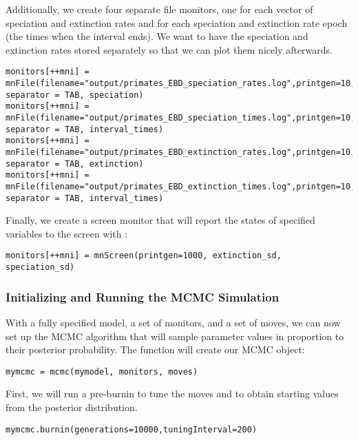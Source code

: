 Additionally, we create four separate file monitors, one for each vector of speciation and extinction rates and for each speciation and extinction rate epoch (\IE the times when the interval ends).
We want to have the speciation and extinction rates stored separately so that we can plot them nicely afterwards.
{\tt \begin{snugshade*}
\begin{lstlisting}
monitors[++mni] = mnFile(filename="output/primates_EBD_speciation_rates.log",printgen=10, separator = TAB, speciation)
monitors[++mni] = mnFile(filename="output/primates_EBD_speciation_times.log",printgen=10, separator = TAB, interval_times)
monitors[++mni] = mnFile(filename="output/primates_EBD_extinction_rates.log",printgen=10, separator = TAB, extinction)
monitors[++mni] = mnFile(filename="output/primates_EBD_extinction_times.log",printgen=10, separator = TAB, interval_times)
\end{lstlisting}
\end{snugshade*}}

Finally, we create a screen monitor that will report the states of specified variables to the screen with :
{\tt \begin{snugshade*}
\begin{lstlisting}
monitors[++mni] = mnScreen(printgen=1000, extinction_sd, speciation_sd)
\end{lstlisting}
\end{snugshade*}}

\subsubsection{Initializing and Running the MCMC Simulation}

With a fully specified model, a set of monitors, and a set of moves, we can now set up the MCMC algorithm that will sample parameter values in proportion to their posterior probability.
The  function will create our MCMC object:
{\tt \begin{snugshade*}
\begin{lstlisting}
mymcmc = mcmc(mymodel, monitors, moves)
\end{lstlisting}
\end{snugshade*}}

First, we will run a pre-burnin to tune the moves and to obtain starting values from the posterior distribution.
{\tt \begin{snugshade*}
\begin{lstlisting}
mymcmc.burnin(generations=10000,tuningInterval=200)
\end{lstlisting}
\end{snugshade*}}


